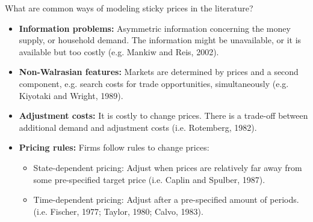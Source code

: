 \documentclass[10pt,c,aspectratio=1610,handout]{beamer}
\begin{document}
\begin{frame}{What are common ways of modeling sticky prices in the literature?}%
  \begin{itemize}%
    \item[$\blacktriangleright$] \textbf{Information problems:} Asymmetric information concerning the money supply, or household demand. The information might be unavailable, or it is available but too costly {\scriptsize (e.g. Mankiw and Reis, 2002)}.%
    \pause%
    \item[$\blacktriangleright$] \textbf{Non-Walrasian features:} Markets are determined by prices and a second component, e.g. search costs for trade opportunities, simultaneously {\scriptsize (e.g. Kiyotaki and Wright, 1989)}.%
    \pause%
    \item[$\blacktriangleright$] \textbf{Adjustment costs:} It is costly to change prices. There is a trade-off between additional demand and adjustment costs {\scriptsize (i.e. Rotemberg, 1982)}.%
    \pause%
    \item[$\blacktriangleright$] \textbf{Pricing rules:} Firms follow rules to change prices:%
    \begin{itemize}%
      \item State-dependent pricing: Adjust when prices are relatively far away from some pre-specified target price {\scriptsize (i.e. Caplin and Spulber, 1987)}.%
      \item Time-dependent pricing: Adjust after a pre-specified amount of periods. {\scriptsize (i.e. Fischer, 1977; Taylor, 1980; Calvo, 1983)}.%
    \end{itemize}%
  \end{itemize}%
\end{frame}%
\end{document}
